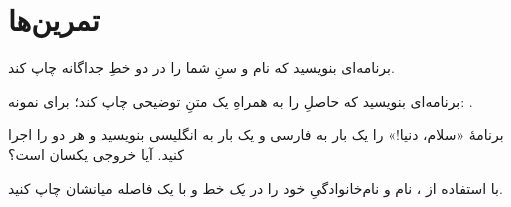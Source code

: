 \section{تمرین‌ها}

\exercise برنامه‌ای بنویسید که نام و سنِ شما را در دو خطِ جداگانه چاپ کند.

\exercise برنامه‌ای بنویسید که حاصلِ  را به همراهِ یک متنِ توضیحی
چاپ کند؛ برای نمونه: .

\exercise برنامهٔ «سلام، دنیا!» را یک بار به فارسی و یک بار به انگلیسی بنویسید
و هر دو را اجرا کنید. آیا خروجی یکسان است؟

\exercise با استفاده از ، نام و نام‌خانوادگیِ خود را در \emph{یک}
خط و با یک فاصله میانشان چاپ کنید.
